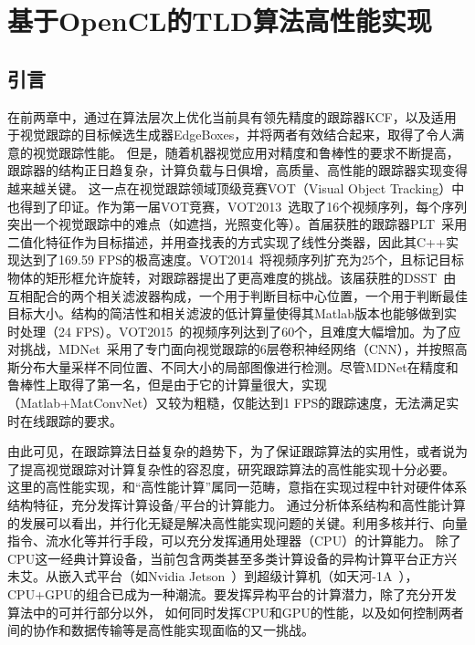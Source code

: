 \chapter{基于OpenCL的TLD算法高性能实现}
\section{引言}
在前两章中，通过在算法层次上优化当前具有领先精度的跟踪器KCF，以及适用于视觉跟踪的目标候选生成器EdgeBoxes，并将两者有效结合起来，取得了令人满意的视觉跟踪性能。
但是，随着机器视觉应用对精度和鲁棒性的要求不断提高，跟踪器的结构正日趋复杂，计算负载与日俱增，高质量、高性能的跟踪器实现变得越来越关键。
这一点在视觉跟踪领域顶级竞赛VOT（Visual Object Tracking）中也得到了印证。作为第一届VOT竞赛，VOT2013~选取了16个视频序列，每个序列突出一个视觉跟踪中的难点（如遮挡，光照变化等）。首届获胜的跟踪器PLT~采用二值化特征作为目标描述，并用查找表的方式实现了线性分类器，因此其C++实现达到了169.59 FPS的极高速度。VOT2014~将视频序列扩充为25个，且标记目标物体的矩形框允许旋转，对跟踪器提出了更高难度的挑战。该届获胜的DSST~由互相配合的两个相关滤波器构成，一个用于判断目标中心位置，一个用于判断最佳目标大小。结构的简洁性和相关滤波的低计算量使得其Matlab版本也能够做到实时处理（24 FPS）。VOT2015~的视频序列达到了60个，且难度大幅增加。为了应对挑战，MDNet~采用了专门面向视觉跟踪的6层卷积神经网络（CNN），并按照高斯分布大量采样不同位置、不同大小的局部图像进行检测。尽管MDNet在精度和鲁棒性上取得了第一名，但是由于它的计算量很大，实现（Matlab+MatConvNet）又较为粗糙，仅能达到1 FPS的跟踪速度，无法满足实时在线跟踪的要求。

由此可见，在跟踪算法日益复杂的趋势下，为了保证跟踪算法的实用性，或者说为了提高视觉跟踪对计算复杂性的容忍度，研究跟踪算法的高性能实现十分必要。
这里的高性能实现，和``高性能计算''属同一范畴，意指在实现过程中针对硬件体系结构特征，充分发挥计算设备/平台的计算能力。
通过分析体系结构和高性能计算的发展可以看出，并行化无疑是解决高性能实现问题的关键。利用多核并行、向量指令、流水化等并行手段，可以充分发挥通用处理器（CPU）的计算能力。
除了CPU这一经典计算设备，当前包含两类甚至多类计算设备的异构计算平台正方兴未艾。从嵌入式平台（如Nvidia Jetson~）到超级计算机（如天河-1A~），CPU+GPU的组合已成为一种潮流。要发挥异构平台的计算潜力，除了充分开发算法中的可并行部分以外，
如何同时发挥CPU和GPU的性能，以及如何控制两者间的协作和数据传输等是高性能实现面临的又一挑战。

